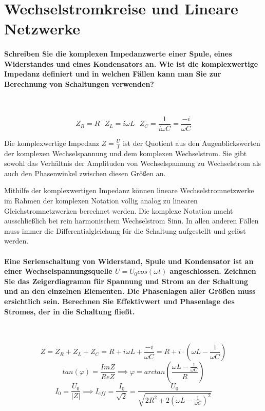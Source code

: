 \documentclass[a4paper, 11pt, ngerman, parskip=half-]{scrartcl}
\begin{document}
\newpage

\section{Wechselstromkreise und Lineare Netzwerke}

\paragraph{Schreiben Sie die komplexen Impedanzwerte einer Spule, eines Widerstandes und eines
    Kondensators an. Wie ist die komplexwertige Impedanz definiert und in welchen Fällen kann man Sie
    zur Berechnung von Schaltungen verwenden?} ~

\begin{equation}
    Z_R = R ~~~ Z_L = i \omega L ~~~ Z_C = \frac{1}{i \omega C} = \frac{-i}{\omega C}
\end{equation}

Die komplexwertige Impedanz $Z = \frac{U}{I}$ ist der Quotient aus den Augenblickswerten der
komplexen Wechselspannung und dem komplexen Wechselstrom. Sie gibt sowohl das Verhältnis der
Amplituden von Wechselspannung zu Wechselstrom als auch den Phasenwinkel zwischen diesen Größen an.

Mithilfe der komplexwertigen Impedanz können lineare Wechselstromnetzwerke im Rahmen der komplexen
Notation völlig analog zu linearen Gleichstromnetzwerken berechnet werden. Die komplexe Notation
macht ausschließlich bei rein harmonischem Wechselstrom Sinn. In allen anderen Fällen muss immer die
Differentialgleichung für die Schaltung aufgestellt und gelöst werden.

\paragraph{Eine Serienschaltung von Widerstand, Spule und Kondensator ist an einer
    Wechselspannungsquelle $U=U_0 cos (\omega t)$ angeschlossen. Zeichnen Sie das Zeigerdiagramm für
    Spannung und Strom an der Schaltung und an den einzelnen Elementen. Die Phasenlagen aller Größen
    muss ersichtlich sein. Berechnen Sie Effektivwert und Phasenlage des Stromes, der in die Schaltung
    fließt.} ~

\begin{equation}
    Z
    = Z_R + Z_L + Z_C
    = R + i \omega L + \frac{-i}{\omega C}
    = R + i \cdot \left(\omega L - \frac{1}{\omega C} \right)
\end{equation}
\begin{equation}
    tan(\varphi)
    = \frac{Im{Z}}{Re{Z}}
    \implies
    \varphi = arctan \left( \frac{\omega L - \frac{1}{\omega C}}{R} \right)
\end{equation}
\begin{equation}
    I_0
    = \frac{U_0}{|Z|}
    \implies
    I_{eff}
    = \frac{I_0}{\sqrt{2}}
    = \frac{U_0}{\sqrt{2 R^2 +2 \left(\omega L - \frac{1}{\omega C} \right)^2}}
\end{equation}
\end{document}
